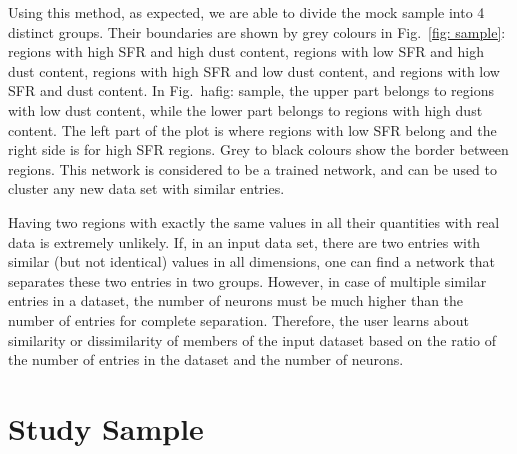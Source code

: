 Using this method, as expected, we are able to divide the mock sample into 4 distinct groups. Their boundaries are shown by grey colours in Fig.~\ref{fig: sample}: regions with high SFR and high dust content, regions with low SFR and high dust content, regions with high SFR and low dust content, and regions with low SFR and dust content. 
In Fig.~ ha{fig: sample}, the upper part belongs to regions with low dust content, while the lower part belongs to regions with high dust content.
The left part of the plot is where regions with low SFR belong and the right side is for high SFR regions.
Grey to black colours show the border between regions.
This network is considered to be a trained network, and can be used to cluster any new data set with similar entries.

Having two regions with exactly the same values in all their quantities with real data is extremely unlikely. 
If, in an input data set, there are two entries with similar (but not identical) values in all dimensions, one can find a network that separates these two entries in two groups.  
However, in case of multiple similar entries in a dataset, the number of neurons must be much higher than the number of entries for complete separation.
Therefore, the user learns about similarity or dissimilarity of members of the input dataset based on the ratio of the number of entries in the dataset and the number of neurons. 

\section{Study Sample}
\label{Sec: data_SOMN}

